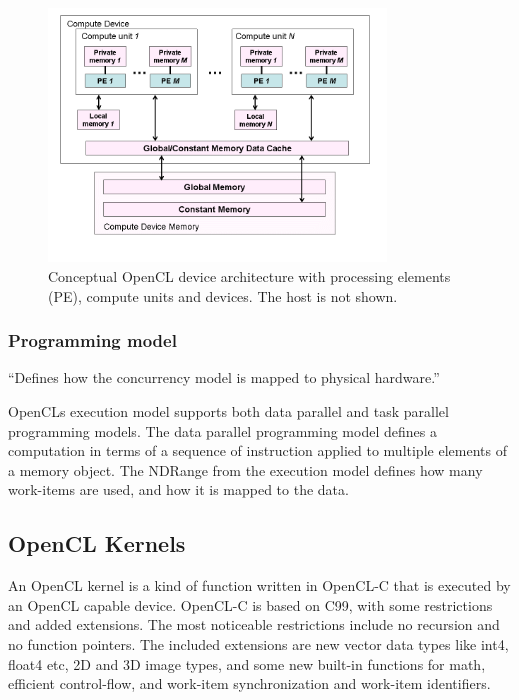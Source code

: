 \begin{figure}[h]
  \centering
  \includegraphics[width=0.8\textwidth]{images/memory-model.png}
  \caption{Conceptual OpenCL device architecture with processing
    elements (PE), compute units and devices. The host is not shown.}
  \label{execution-model-figure}
\end{figure}



\subsubsection{Programming model}

``Defines how the concurrency model is mapped to physical hardware.''

OpenCLs execution model supports both data parallel and task parallel
programming models. The data parallel programming model defines a
computation in terms of a sequence of instruction applied to multiple
elements of a memory object. The NDRange from the execution model
defines how many work-items are used, and how it is mapped to the
data.


\subsection{OpenCL Kernels}

An OpenCL kernel is a kind of function written in OpenCL-C that is
executed by an OpenCL capable device. OpenCL-C is based on C99, with
some restrictions and added extensions. The most noticeable
restrictions include no recursion and no function pointers. The
included extensions are new vector data types like int4, float4 etc,
2D and 3D image types, and some new built-in functions for math,
efficient control-flow, and work-item synchronization and work-item
identifiers.

